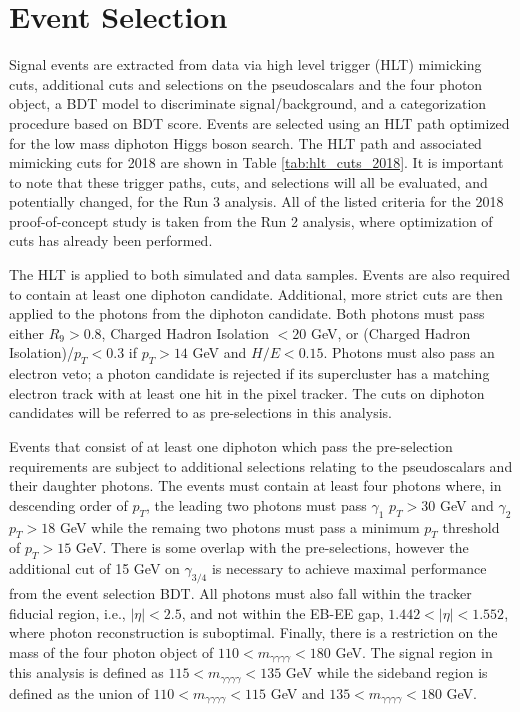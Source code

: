 \documentclass[12pt]{article}
\begin{document}
\section{Event Selection}
Signal events are extracted from data via high level trigger (HLT) mimicking cuts, additional cuts and selections on the pseudoscalars and the four photon object, a BDT model to discriminate signal/background, and a categorization procedure based on BDT score. Events are selected using an HLT path optimized for the low mass diphoton Higgs boson search. The HLT path and associated mimicking cuts for 2018 are shown in Table \ref{tab:hlt_cuts_2018}. It is important to note that these trigger paths, cuts, and selections will all be evaluated, and potentially changed, for the Run 3 analysis. All of the listed criteria for the 2018 proof-of-concept study is taken from the Run 2 analysis, where optimization of cuts has already been performed.\par

The HLT is applied to both simulated and data samples. Events are also required to contain at least one diphoton candidate. Additional, more strict cuts are then applied to the photons from the diphoton candidate. Both photons must pass either $R_9 > 0.8$, Charged Hadron Isolation $<20$ GeV, or (Charged Hadron Isolation)/$p_T < 0.3$ if $p_T > 14$ GeV and $H/E < 0.15$. Photons must also pass an electron veto; a photon candidate is rejected if its supercluster has a matching electron track with at least one hit in the pixel tracker. The cuts on diphoton candidates will be referred to as pre-selections in this analysis.\par

Events that consist of at least one diphoton which pass the pre-selection requirements are subject to additional selections relating to the pseudoscalars and their daughter photons. The events must contain at least four photons where, in descending order of $p_T$, the leading two photons must pass $\gamma_1$ $p_T > 30$ GeV and $\gamma_2$ $p_T > 18$ GeV while the remaing two photons must pass a minimum $p_T$ threshold of $p_{T} > 15$ GeV. There is some overlap with the pre-selections, however the additional cut of 15 GeV on $\gamma_{3/4}$ is necessary to achieve maximal performance from the event selection BDT. All photons must also fall within the tracker fiducial region, i.e., $|\eta| < 2.5$, and not within the EB-EE gap, $1.442 < |\eta| < 1.552$, where photon reconstruction is suboptimal. Finally, there is a restriction on the mass of the four photon object of $110 < m_{\gamma \gamma \gamma \gamma} < 180$ GeV. The signal region in this analysis is defined as $115 < m_{\gamma \gamma \gamma \gamma} < 135$ GeV while the sideband region is defined as the union of $110 < m_{\gamma \gamma \gamma \gamma} < 115$ GeV and $135 < m_{\gamma \gamma \gamma \gamma} < 180$ GeV.
\end{document}
